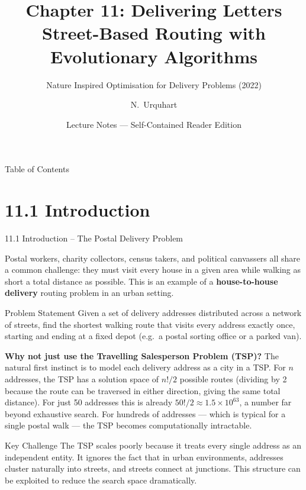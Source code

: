 \documentclass[aspectratio=169,10pt]{beamer}
\title[Chapter 11: Delivering Letters]{%
  Chapter 11: Delivering Letters\\[4pt]
  \normalsize Street-Based Routing with Evolutionary Algorithms}
\subtitle{Nature Inspired Optimisation for Delivery Problems (2022)}
\author{N.\ Urquhart}
\date{Lecture Notes --- Self-Contained Reader Edition}
\begin{document}
\begin{frame}
  \titlepage
\end{frame}

\begin{frame}[allowframebreaks]{Table of Contents}
  \tableofcontents
\end{frame}

\section{11.1 Introduction}

\begin{frame}[allowframebreaks]{11.1 Introduction -- The Postal Delivery Problem}

  Postal workers, charity collectors, census takers, and political canvassers all
  share a common challenge: they must visit every house in a given area while
  walking as short a total distance as possible.
  This is an example of a \textbf{house-to-house delivery} routing problem in
  an urban setting.

  \begin{block}{Problem Statement}
    Given a set of delivery addresses distributed across a network of streets,
    find the shortest walking route that visits every address exactly once,
    starting and ending at a fixed depot (e.g.\ a postal sorting office or
    a parked van).
  \end{block}

  \textbf{Why not just use the Travelling Salesperson Problem (TSP)?}
  The natural first instinct is to model each delivery address as a city in a
  TSP.  For $n$ addresses, the TSP has a solution space of $n!/2$ possible
  routes (dividing by 2 because the route can be traversed in either direction,
  giving the same total distance).  For just 50 addresses this is already
  $50!/2 \approx 1.5 \times 10^{63}$, a number far beyond exhaustive search.
  For hundreds of addresses --- which is typical for a single postal walk ---
  the TSP becomes computationally intractable.

  \begin{alertblock}{Key Challenge}
    The TSP scales poorly because it treats every single address as an
    independent entity.  It ignores the fact that in urban environments,
    addresses cluster naturally into streets, and streets connect at junctions.
    This structure can be exploited to reduce the search space dramatically.
  \end{alertblock}


\end{frame}
\end{document}
